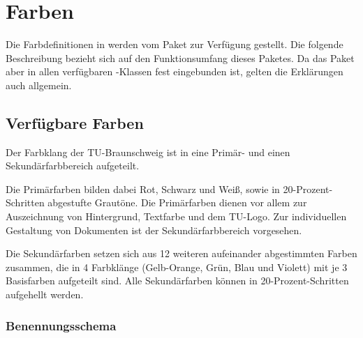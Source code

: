 \chapter{Farben}\label{chap:tubscolors}

\newcommand{\classoptionitem}[1][ ]{
  \item[\mdseries{\ttfamily%
    \textbackslash usepackage%
    {[{\color{tuRed}#1}]}%
    \{tubslogo\}}]\hfill\\
}

Die Farbdefinitionen in \tubslatex werden vom Paket 
zur Verfügung gestellt. Die folgende Beschreibung bezieht sich
auf den Funktionsumfang dieses Paketes.
Da das Paket aber in allen verfügbaren \tubslatex-Klassen fest eingebunden ist,
gelten die Erklärungen auch allgemein.

\newcommand{\rainbow}[2][\relax]{{\noindent\sffamily\footnotesize%
\ifx#1\relax\colorlet{fglbg}{black}\else\colorlet{fglbg}{#1}\fi
\colorbox{#2100}{\hbox to 0.188\textwidth{%
  \color{fglbg}\vphantom{Fg}#2{}100\hfill}}%
\colorbox{#280}{\hbox to 0.188\textwidth{%
  \color{fglbg}\vphantom{Fg}#2{}80\hfill}}%
\colorbox{#260}{\hbox to 0.188\textwidth{\vphantom{Fg}#2{}60\hfill}}%
\colorbox{#240}{\hbox to 0.188\textwidth{\vphantom{Fg}#2{}40\hfill}}%
\colorbox{#220}{\hbox to 0.188\textwidth{\vphantom{Fg}#2{}20\hfill}}\\%
}}

\section{Verfügbare Farben}

Der Farbklang der TU-Braunschweig ist in eine Primär- und einen
Sekundärfarbbereich aufgeteilt.

Die Primärfarben bilden dabei Rot, Schwarz und Weiß, sowie in
20-Prozent-Schritten abgestufte Grautöne. Die Primärfarben dienen
vor allem zur Auszeichnung von Hintergrund, Textfarbe und dem TU-Logo.
Zur individuellen Gestaltung von Dokumenten ist der Sekundärfarbbereich
vorgesehen.

Die Sekundärfarben setzen sich aus 12 weiteren aufeinander abgestimmten
Farben zusammen, die 
in 4 Farbklänge (Gelb-Orange, Grün, Blau und Violett) mit je 3 Basisfarben
aufgeteilt sind.
Alle Sekundärfarben können in 20-Prozent-Schritten aufgehellt werden.

\subsection{Benennungsschema}

